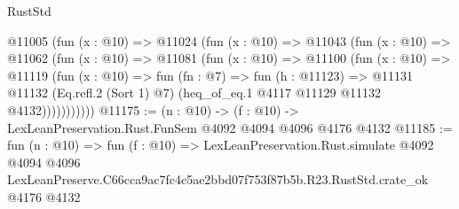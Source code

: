 \begin{lexlean}{RustStd}
\begin{coremodule}
        @11005
          (fun (x : @10) =>
          @11024
            (fun (x : @10) =>
            @11043
              (fun (x : @10) =>
              @11062
                (fun (x : @10) =>
                @11081
                  (fun (x : @10) =>
                  @11100
                    (fun (x : @10) =>
                    @11119
                      (fun (x : @10) =>
                      fun (fn : @7) =>
                      fun (h : @11123) =>
                      @11131
                        @11132
                        (Eq.refl.{2} (Sort 1) @7)
                        (heq_of_eq.{1} @4117 @11129 @11132 @4132)))))))))))
@11175 := (n : @10) -> (f : @10) -> LexLeanPreservation.Rust.FunSem @4092 @4094 @4096 @4176 @4132
@11185 := fun (n : @10) =>
  fun (f : @10) =>
  LexLeanPreservation.Rust.simulate
    @4092
    @4094
    @4096
    LexLeanPreserve.C66cca9ac7fc4c5ae2bbd07f753f87b5b.R23.RustStd.crate_ok
    @4176
    @4132
\end{coremodule}
\end{lexlean}
